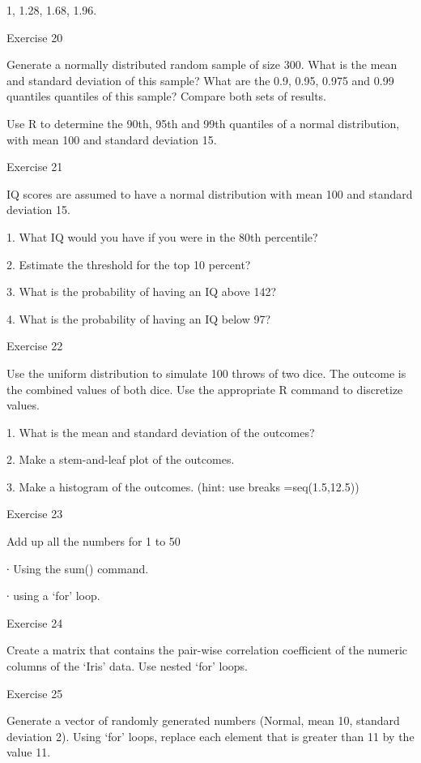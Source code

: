 1, 1.28, 1.68, 1.96.

 

Exercise 20

 

Generate a normally distributed random sample of size 300. What is the mean and standard deviation of this sample? What are the 0.9, 0.95, 0.975 and 0.99 quantiles quantiles of this sample? Compare both sets of results.

 

Use R to determine the 90th, 95th and 99th quantiles of a normal distribution, with mean 100 and standard deviation 15.

 

Exercise 21

 

IQ scores are assumed to have a normal distribution with mean 100 and standard deviation 15.

 
1.
What IQ would you have if you were in the 80th percentile?

2.
Estimate the threshold for the top 10 percent?

3.
What is the probability of having an IQ above 142?

4.
What is the probability of having an IQ below 97?


 

 

Exercise 22

 

Use the uniform distribution to simulate 100 throws of two dice. The outcome is the combined values of both dice. Use the appropriate R command to discretize values.

 
1.
What is the mean and standard deviation of the outcomes?

2.
Make a stem-and-leaf plot of the outcomes.

3.
Make a histogram of the outcomes. (hint: use breaks =seq(1.5,12.5))


 

Exercise 23

 

Add up all the numbers for 1 to 50

∙       Using the sum() command.

∙       using a ‘for’ loop.

 

Exercise 24

Create a matrix that contains the pair-wise correlation coefficient of the numeric columns of the ‘Iris’ data. Use nested ‘for’ loops.

 

Exercise 25

Generate a vector of randomly generated numbers (Normal, mean 10, standard deviation 2). Using ‘for’ loops, replace each element that is greater than 11 by the value 11.

 

 

